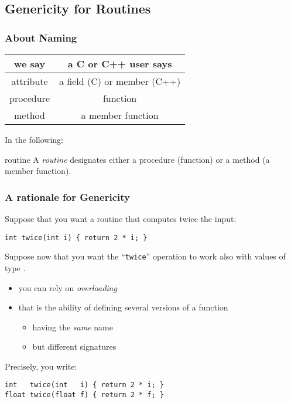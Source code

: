 \documentclass{beamer}
\newcommand{\cpp}{{C++}\xspace}
\newcommand{\kw}[1]{{\color{blue}{\texttt{#1}}}\xspace}
\newcommand{\code}[1]{{\scriptsize{\texttt{#1}}}\xspace}
\begin{document}
\subsection{Genericity for Routines}


\begin{frame}
  \frametitle{About Naming}

  \begin{center}
    \begin{tabular}{|c|c|}
      \hline
      we say & a C or \cpp user says \\
      \hline \hline 
      attribute & a field (C) or member (\cpp) \\
      procedure & function \\
      method & a member function \\
      \hline 
    \end{tabular}
  \end{center}

\smallskip

In the following:
\begin{block}{routine}
  A \emph{routine} designates either a procedure (function) or a
  method (a member function).
\end{block}

\end{frame}


\begin{frame}[fragile]
  \frametitle{A rationale for Genericity}

Suppose that you want a routine that computes twice the input:
\begin{lstlisting}
int twice(int i) { return 2 * i; }
\end{lstlisting}

Suppose now that you want the ``\code{twice}'' operation to work also
with values of type \kw{float}.

\begin{itemize}
\item you can rely on \emph{overloading}
\item that is the ability of defining several versions of a function
  \begin{itemize}
  \item having the \emph{same} name
  \item but different signatures
  \end{itemize}
\end{itemize}

Precisely, you write:
\begin{lstlisting}
int   twice(int   i) { return 2 * i; }
float twice(float f) { return 2 * f; }
\end{lstlisting}

\end{frame}
\end{document}
